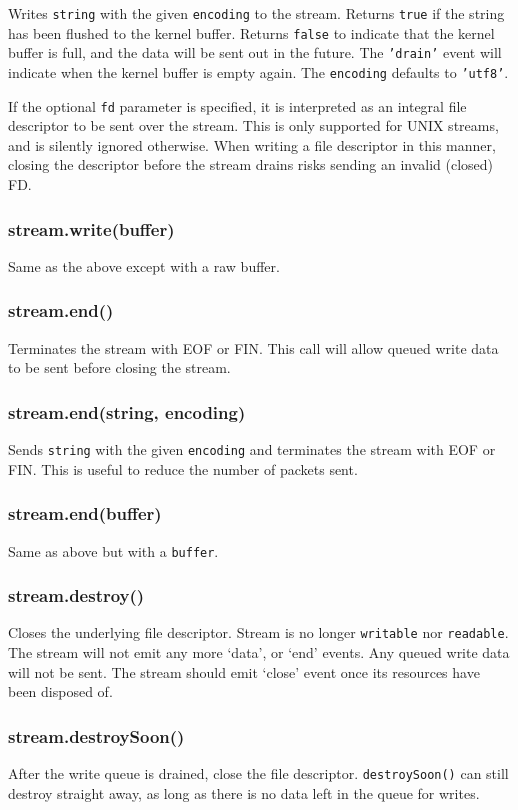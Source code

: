 Writes \texttt{string} with the given \texttt{encoding} to the stream.
Returns \texttt{true} if the string has been flushed to the kernel
buffer. Returns \texttt{false} to indicate that the kernel buffer is
full, and the data will be sent out in the future. The \texttt{'drain'}
event will indicate when the kernel buffer is empty again. The
\texttt{encoding} defaults to \texttt{'utf8'}.

If the optional \texttt{fd} parameter is specified, it is interpreted as
an integral file descriptor to be sent over the stream. This is only
supported for UNIX streams, and is silently ignored otherwise. When
writing a file descriptor in this manner, closing the descriptor before
the stream drains risks sending an invalid (closed) FD.

\subsubsection{stream.write(buffer)}

Same as the above except with a raw buffer.

\subsubsection{stream.end()}

Terminates the stream with EOF or FIN. This call will allow queued write
data to be sent before closing the stream.

\subsubsection{stream.end(string, encoding)}

Sends \texttt{string} with the given \texttt{encoding} and terminates
the stream with EOF or FIN. This is useful to reduce the number of
packets sent.

\subsubsection{stream.end(buffer)}

Same as above but with a \texttt{buffer}.

\subsubsection{stream.destroy()}

Closes the underlying file descriptor. Stream is no longer
\texttt{writable} nor \texttt{readable}. The stream will not emit any
more `data', or `end' events. Any queued write data will not be sent.
The stream should emit `close' event once its resources have been
disposed of.

\subsubsection{stream.destroySoon()}

After the write queue is drained, close the file descriptor.
\texttt{destroySoon()} can still destroy straight away, as long as there
is no data left in the queue for writes.
